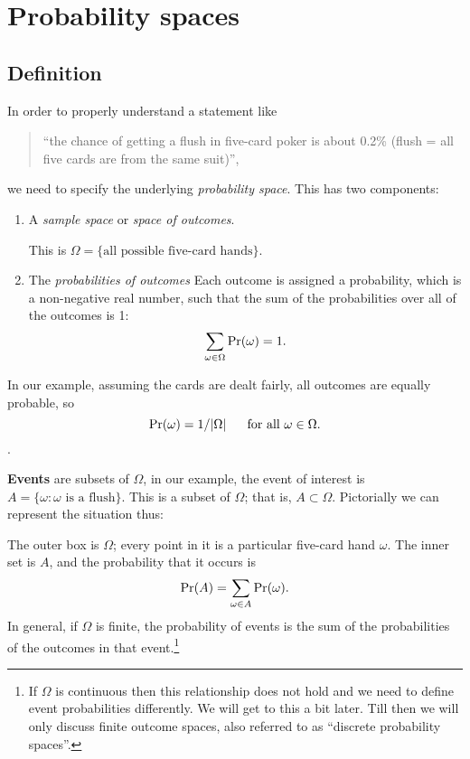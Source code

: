 \chapter{Probability spaces}

\section{Definition}

In order to properly understand a statement like
\begin{quote}
``the chance of getting a flush in five-card poker is about 0.2\%
(flush = all five cards are from the same suit)'',
\end{quote}
we need to specify the underlying {\it probability space}. This has two components:
\begin{enumerate}
\item A {\it sample space} or {\it space of outcomes}.

This is $\Omega = \{\mbox{all possible five-card hands}\}$.
\item The {\it probabilities of outcomes} Each outcome is assigned a
  probability, which is a non-negative real number, such that the sum
  of the probabilities over all of the outcomes is 1:
$$ \sum_{\omega \in \Omega} \mbox{\rm Pr}(\omega) = 1 .$$
\end{enumerate}

In our example, assuming the cards are dealt fairly, all outcomes are equally probable, so
$$\mbox{\rm Pr}(\omega) = 1/|\Omega| \mbox{\ \ \ \ \ for all $\omega \in \Omega$.} $$.

{\bf Events} are subsets of $\Omega$, in our example, the event of
interest is $A = \{\omega: \mbox{$\omega$ is a flush}\}$. This is a
subset of $\Omega$; that is, $A \subset \Omega$. Pictorially we can
represent the situation thus:

\begin{center}
\end{center}

\noindent
The outer box is $\Omega$; every point in it is a particular five-card hand $\omega$. The inner set is $A$, and the probability that it occurs is
$$ \mbox{\rm Pr}(A) = \sum_{\omega \in A} \mbox{\rm Pr}(\omega) .$$
In general, if $\Omega$ is finite, the probability of events is the
sum of the probabilities of the outcomes in that event.\footnote{If
  $\Omega$ is continuous then this relationship does not hold and we
  need to define event probabilities differently. We will get to this
  a bit later. Till then we will only discuss finite outcome spaces,
  also referred to as ``discrete probability spaces''.}

